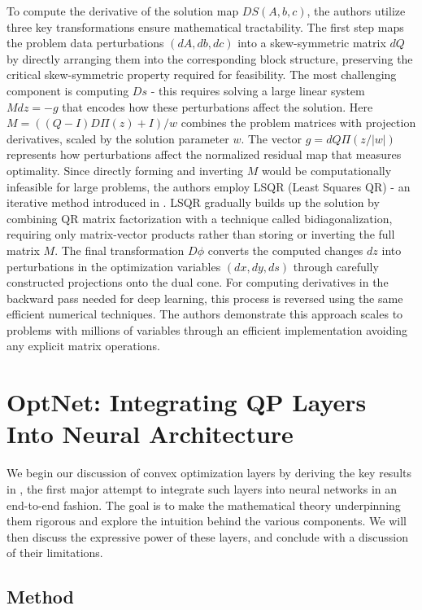 \documentclass{article}
\begin{document}
To compute the derivative of the solution map $DS(A,b,c)$, the authors utilize three key transformations ensure mathematical tractability. The first step maps the problem data perturbations $(dA,db,dc)$ into a skew-symmetric matrix $dQ$ by directly arranging them into the corresponding block structure, preserving the critical skew-symmetric property required for feasibility. The most challenging component is computing $Ds$ - this requires solving a large linear system $Mdz = -g$ that encodes how these perturbations affect the solution. Here $M = ((Q-I)D\Pi(z)+I)/w$ combines the problem matrices with projection derivatives, scaled by the solution parameter $w$. The vector $g = dQ\Pi(z/|w|)$ represents how perturbations affect the normalized residual map that measures optimality. Since directly forming and inverting $M$ would be computationally infeasible for large problems, the authors employ LSQR (Least Squares QR) - an iterative method introduced in \citet{lsqr}. LSQR gradually builds up the solution by combining QR matrix factorization with a technique called bidiagonalization, requiring only matrix-vector products rather than storing or inverting the full matrix $M$. The final transformation $D\phi$ converts the computed changes $dz$ into perturbations in the optimization variables $(dx,dy,ds)$ through carefully constructed projections onto the dual cone. For computing derivatives in the backward pass needed for deep learning, this process is reversed using the same efficient numerical techniques. The authors demonstrate this approach scales to problems with millions of variables through an efficient implementation avoiding any explicit matrix operations.

\section{OptNet: Integrating QP Layers Into Neural Architecture}
We begin our discussion of convex optimization layers by deriving the key results in \citet{optnet}, the first major attempt to integrate such layers into neural networks in an end-to-end fashion. The goal is to make the mathematical theory underpinning them rigorous and explore the intuition behind the various components. We will then discuss the expressive power of these layers, and conclude with a discussion of their limitations. 

\subsection{Method}
\end{document}
